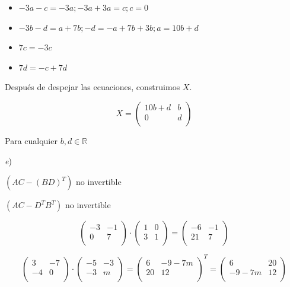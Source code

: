 \documentclass[11pt,a4paper]{article}
\begin{document}
\begin{enumerate}
\begin{itemize}
\item $-3a-c = -3a; -3a+3a = c; c=0 $
\end{itemize}

\begin{itemize}
\item $-3b-d = a+7b; -d=-a+7b+3b; a=10b+d$
\end{itemize}

\begin{itemize}
\item $7c=-3c$
\end{itemize}

\begin{itemize}
\item $7d=-c+7d$
\end{itemize}

Después de despejar las ecuaciones, construimos $X$.

$$X = 
\begin{pmatrix} 
10b+d & b \\
0  & d \\
\end{pmatrix}
$$

Para cualquier $b,d \in \mathbb{R}$

\vspace{0.5cm}

\textit{e}) 

$(AC-(BD)^{T})$ no invertible

$(AC-D^{T}B^{T})$ no invertible

$$ 
\begin{pmatrix} 
-3 & -1 \\
0  & 7 \\
\end{pmatrix}
\cdot
\begin{pmatrix} 
1 & 0 \\
3  & 1 \\
\end{pmatrix}
=
\begin{pmatrix} 
-6 & -1 \\
21  & 7 \\
\end{pmatrix}
$$

$$
\begin{pmatrix} 
3 & -7 \\
-4  & 0 \\
\end{pmatrix}
\cdot
\begin{pmatrix} 
-5 & -3 \\
-3  & m \\
\end{pmatrix}
=
\begin{pmatrix} 
6 & -9-7m \\
20  & 12 \\
\end{pmatrix}^{T}
=
\begin{pmatrix} 
6 &  20 \\
-9-7m  & 12 \\
\end{pmatrix}
$$


\end{enumerate}
\end{document}
